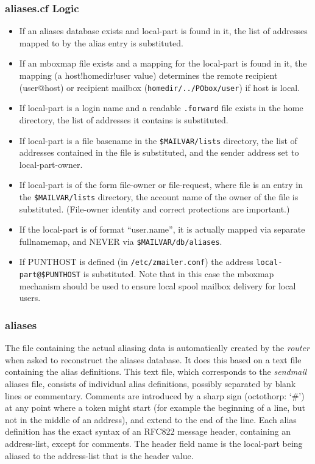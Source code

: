 \subsubsection{aliases.cf Logic}

\begin{itemize}
\item If an aliases database exists and local-part is found in it, the list of
addresses mapped to by the alias entry is substituted.
\item If an mboxmap file exists and a mapping for the local-part is found in it,
the mapping (a host!homedir!user value) determines the remote recipient
(user@host) or recipient mailbox ({\tt homedir/../PObox/user}) if host 
is local.
\item If local-part is a login name and a readable {\tt .forward} file 
exists in the home directory, the list of addresses it contains is substituted.
\item If local-part is a file basename in the {\tt \$MAILVAR/lists} 
directory, the   list of addresses contained in the file is substituted, and 
the sender address set to local-part-owner.
\item If local-part is of the form file-owner or file-request, where file is
an entry in the {\tt \$MAILVAR/lists} directory, the account name 
of the owner of the file is substituted.   (File-owner identity and correct 
protections are important.)
\item If the local-part is of format  ``user.name'',  it is actually mapped via
separate   fullnamemap, and NEVER via {\tt \$MAILVAR/db/aliases}.
\item If PUNTHOST is defined (in {\tt /etc/zmailer.conf}) the address
{\tt local-part@\$PUNTHOST} is substituted.  Note that in this case
the mboxmap mechanism should be used to ensure local spool
mailbox delivery for local users.
\end{itemize}


\subsubsection{aliases}

The file containing the actual aliasing data is automatically created by
the {\em router} when asked to reconstruct the aliases database.  It does this
based on a text file containing the alias definitions.  This text file,
which corresponds to the {\em sendmail} aliases file, consists of individual
alias definitions, possibly separated by blank lines or commentary.
Comments are introduced by a sharp sign (octothorp: `\#') at any point where
a token might start (for example the beginning of a line, but not in the
middle of an address), and extend to the end of the line.  Each alias
definition has the exact syntax of an RFC822 message header, containing an
address-list, except for comments.  The header field name is the local-part
being aliased to the address-list that is the header value.

